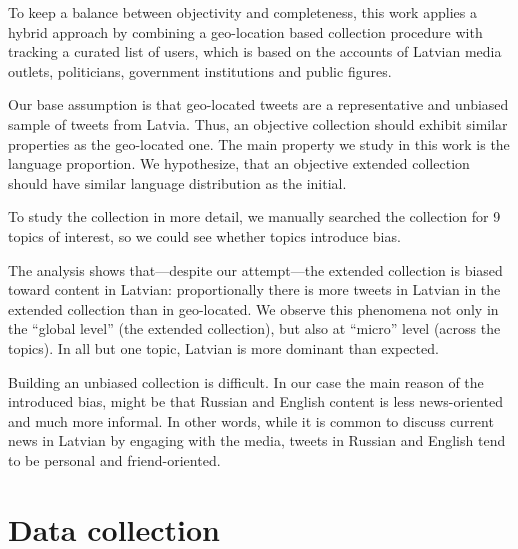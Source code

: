 \documentclass{IOS-Book-Article}
\begin{document}
To keep a balance between objectivity and completeness, this work applies a hybrid approach by combining a geo-location based collection procedure with tracking a curated list of users, which is based on the accounts of Latvian media outlets, politicians, government institutions and public figures.

Our base assumption is that geo-located tweets are a representative and unbiased sample of tweets from Latvia. Thus, an objective collection should exhibit similar properties as the geo-located one. The main property we study in this work is the language proportion. We hypothesize, that an objective extended collection should have similar language distribution as the initial.

To study the collection in more detail, we manually searched the collection for 9 topics of interest, so we could see whether topics introduce bias.


The analysis shows that---despite our attempt---the extended collection is biased toward content in Latvian: proportionally there is more tweets in Latvian in the extended collection than in geo-located. We observe this phenomena not only in the ``global level'' (the extended collection), but also at ``micro'' level (across the topics). In all but one topic, Latvian is more dominant than expected.


Building an unbiased collection is difficult.  In our case the main reason of the introduced bias, might be that Russian and English content is less news-oriented and much more informal. In other words, while it is common to discuss current news in Latvian by engaging with the media, tweets in Russian and English tend to be personal and friend-oriented.

\section{Data collection}
\label{sec:data-collection}
\end{document}
